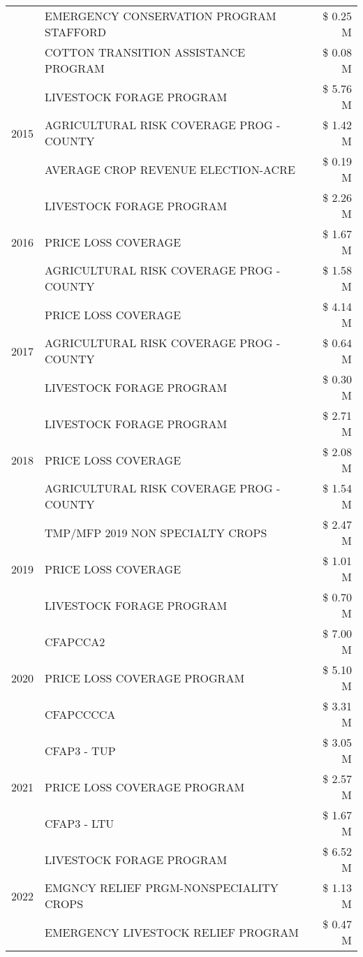 \begin{tabular}{llr}
 & EMERGENCY CONSERVATION PROGRAM STAFFORD & \$ 0.25 M \\
 & COTTON TRANSITION ASSISTANCE PROGRAM & \$ 0.08 M \\
\cline{1-3}
\multirow[t]{3}{*}{2015} & LIVESTOCK FORAGE PROGRAM & \$ 5.76 M \\
 & AGRICULTURAL RISK COVERAGE PROG - COUNTY & \$ 1.42 M \\
 & AVERAGE CROP REVENUE ELECTION-ACRE & \$ 0.19 M \\
\cline{1-3}
\multirow[t]{3}{*}{2016} & LIVESTOCK FORAGE PROGRAM & \$ 2.26 M \\
 & PRICE LOSS COVERAGE & \$ 1.67 M \\
 & AGRICULTURAL RISK COVERAGE PROG - COUNTY & \$ 1.58 M \\
\cline{1-3}
\multirow[t]{3}{*}{2017} & PRICE LOSS COVERAGE & \$ 4.14 M \\
 & AGRICULTURAL RISK COVERAGE PROG - COUNTY & \$ 0.64 M \\
 & LIVESTOCK FORAGE PROGRAM & \$ 0.30 M \\
\cline{1-3}
\multirow[t]{3}{*}{2018} & LIVESTOCK FORAGE PROGRAM & \$ 2.71 M \\
 & PRICE LOSS COVERAGE & \$ 2.08 M \\
 & AGRICULTURAL RISK COVERAGE PROG - COUNTY & \$ 1.54 M \\
\cline{1-3}
\multirow[t]{3}{*}{2019} & TMP/MFP 2019 NON SPECIALTY CROPS & \$ 2.47 M \\
 & PRICE LOSS COVERAGE & \$ 1.01 M \\
 & LIVESTOCK FORAGE PROGRAM & \$ 0.70 M \\
\cline{1-3}
\multirow[t]{3}{*}{2020} & CFAPCCA2 & \$ 7.00 M \\
 & PRICE LOSS COVERAGE PROGRAM & \$ 5.10 M \\
 & CFAPCCCCA & \$ 3.31 M \\
\cline{1-3}
\multirow[t]{3}{*}{2021} & CFAP3 - TUP & \$ 3.05 M \\
 & PRICE LOSS COVERAGE PROGRAM & \$ 2.57 M \\
 & CFAP3 - LTU & \$ 1.67 M \\
\cline{1-3}
\multirow[t]{3}{*}{2022} & LIVESTOCK FORAGE PROGRAM & \$ 6.52 M \\
 & EMGNCY RELIEF PRGM-NONSPECIALITY CROPS & \$ 1.13 M \\
 & EMERGENCY LIVESTOCK RELIEF PROGRAM & \$ 0.47 M \\
\cline{1-3}
\bottomrule
\end{tabular}
